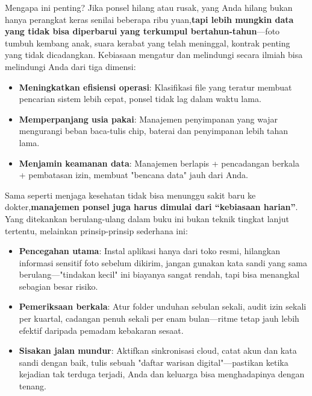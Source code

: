 \begin{tcbinfo}{Mengapa ini penting?}
Jika ponsel hilang atau rusak, yang Anda hilang bukan hanya perangkat keras senilai beberapa ribu yuan,\textbf{tapi lebih mungkin data yang tidak bisa diperbarui yang terkumpul bertahun-tahun}—foto tumbuh kembang anak, suara kerabat yang telah meninggal, kontrak penting yang tidak dicadangkan. Kebiasaan mengatur dan melindungi secara ilmiah bisa melindungi Anda dari tiga dimensi:

\begin{itemize}
  \item \textbf{Meningkatkan efisiensi operasi}: Klasifikasi file yang teratur membuat pencarian sistem lebih cepat, ponsel tidak lag dalam waktu lama.
  \item \textbf{Memperpanjang usia pakai}: Manajemen penyimpanan yang wajar mengurangi beban baca-tulis chip, baterai dan penyimpanan lebih tahan lama.
  \item \textbf{Menjamin keamanan data}: Manajemen berlapis + pencadangan berkala + pembatasan izin, membuat "bencana data" jauh dari Anda.
\end{itemize}

\end{tcbinfo}


Sama seperti menjaga kesehatan tidak bisa menunggu sakit baru ke dokter,\textbf{manajemen ponsel juga harus dimulai dari “kebiasaan harian”}. Yang ditekankan berulang-ulang dalam buku ini bukan teknik tingkat lanjut tertentu, melainkan prinsip-prinsip sederhana ini:

\begin{itemize}
  \item \textbf{Pencegahan utama}: Instal aplikasi hanya dari toko resmi, hilangkan informasi sensitif foto sebelum dikirim, jangan gunakan kata sandi yang sama berulang—"tindakan kecil" ini biayanya sangat rendah, tapi bisa menangkal sebagian besar risiko.
  \item \textbf{Pemeriksaan berkala}: Atur folder unduhan sebulan sekali, audit izin sekali per kuartal, cadangan penuh sekali per enam bulan—ritme tetap jauh lebih efektif daripada pemadam kebakaran sesaat.
  \item \textbf{Sisakan jalan mundur}: Aktifkan sinkronisasi cloud, catat akun dan kata sandi dengan baik, tulis sebuah "daftar warisan digital"—pastikan ketika kejadian tak terduga terjadi, Anda dan keluarga bisa menghadapinya dengan tenang.
\end{itemize}
